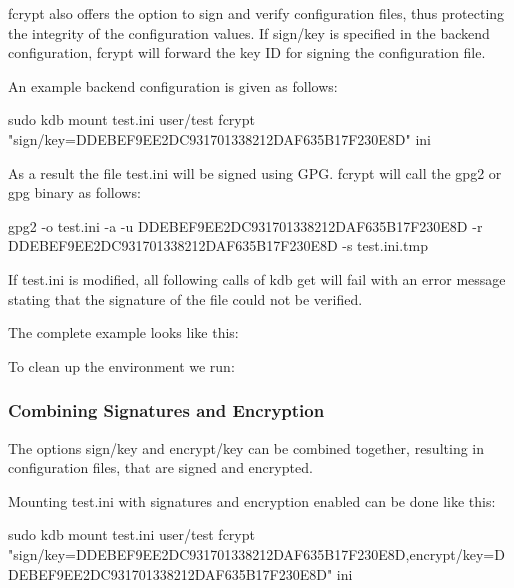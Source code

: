 {\ttfamily fcrypt} also offers the option to sign and verify configuration files, thus protecting the integrity of the configuration values. If {\ttfamily sign/key} is specified in the backend configuration, {\ttfamily fcrypt} will forward the key ID for signing the configuration file.

An example backend configuration is given as follows\+: \begin{DoxyVerb}    sudo kdb mount test.ini user/test fcrypt "sign/key=DDEBEF9EE2DC931701338212DAF635B17F230E8D" ini
\end{DoxyVerb}


As a result the file {\ttfamily test.\+ini} will be signed using G\+PG. {\ttfamily fcrypt} will call the {\ttfamily gpg2} or {\ttfamily gpg} binary as follows\+: \begin{DoxyVerb}    gpg2 -o test.ini -a -u DDEBEF9EE2DC931701338212DAF635B17F230E8D -r DDEBEF9EE2DC931701338212DAF635B17F230E8D -s test.ini.tmp
\end{DoxyVerb}


If {\ttfamily test.\+ini} is modified, all following calls of {\ttfamily kdb get} will fail with an error message stating that the signature of the file could not be verified.

The complete example looks like this\+:




To clean up the environment we run\+:




\subsubsection*{Combining Signatures and Encryption}

The options {\ttfamily sign/key} and {\ttfamily encrypt/key} can be combined together, resulting in configuration files, that are signed and encrypted.

Mounting {\ttfamily test.\+ini} with signatures and encryption enabled can be done like this\+: \begin{DoxyVerb}    sudo kdb mount test.ini user/test fcrypt "sign/key=DDEBEF9EE2DC931701338212DAF635B17F230E8D,encrypt/key=DDEBEF9EE2DC931701338212DAF635B17F230E8D" ini
\end{DoxyVerb}


